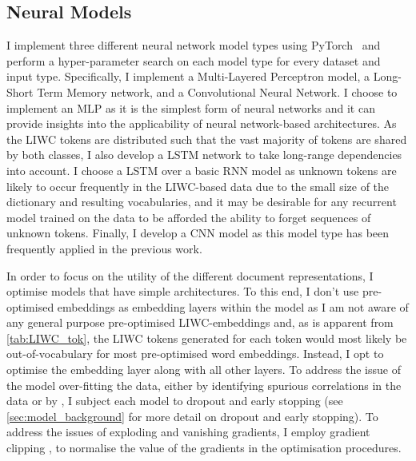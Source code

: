 \subsection{Neural Models}\label{sec:redux_neural}  
I implement three different neural network model types using PyTorch~\citep{Paszke:2019} and perform a hyper-parameter search on each model type for every dataset and input type.  
Specifically, I implement a Multi-Layered Perceptron model, a Long-Short Term Memory network, and a Convolutional Neural Network.  
I choose to implement an MLP as it is the simplest form of neural networks and it can provide insights into the applicability of neural network-based architectures.  
As the LIWC tokens are distributed such that the vast majority of tokens are shared by both classes, I also develop a LSTM network to take long-range dependencies into account.  
I choose a LSTM over a basic RNN model as unknown tokens are likely to occur frequently in the LIWC-based data due to the small size of the dictionary and resulting vocabularies, and it may be desirable for any recurrent model trained on the data to be afforded the ability to forget sequences of unknown tokens.  
Finally, I develop a CNN model as this model type has been frequently applied in the previous work.  
  
In order to focus on the utility of the different document representations, I optimise models that have simple architectures.  
To this end, I  don't use pre-optimised embeddings as embedding layers within the model as I am not aware of any general purpose pre-optimised LIWC-embeddings and, as is apparent from \cref{tab:LIWC_tok}, the LIWC tokens generated for each token would most likely be out-of-vocabulary for most pre-optimised word embeddings.  
Instead, I opt to optimise the embedding layer along with all other layers.  
To address the issue of the model over-fitting the data, either by identifying spurious correlations in the data or by , I subject each model to dropout and early stopping (see \cref{sec:model_background} for more detail on dropout and early stopping).  
To address the issues of exploding and vanishing gradients, I employ gradient clipping \citep{Bengio:1994}, to normalise the value of the gradients in the optimisation procedures.  
  
